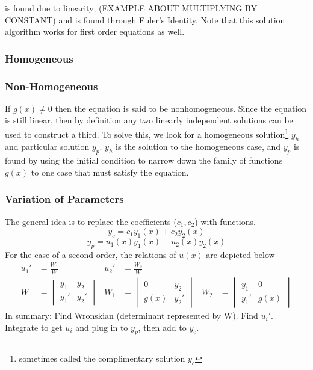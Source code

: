      is found due to linearity; (EXAMPLE ABOUT MULTIPLYING BY CONSTANT) and  is found through Euler's Identity. Note that this solution algorithm works for first order equations as well.  
    \\[0.25cm]
    
    \subsubsection{Homogeneous}
    \subsubsection{Non-Homogeneous}
        If $g(x)\neq0$ then the equation is said to be nonhomogeneous. Since the equation is still linear, then by definition any two linearly independent solutions can be used to construct a third. To solve this, we look for a homogeneous solution\footnote{sometimes called the complimentary solution $y_c$} $y_h$ and particular solution $y_p$. $y_h$ is the solution to the homogeneous case, and $y_p$ is found by using the initial condition to narrow down the family of functions $g(x)$ to one case that must satisfy the equation.

    \subsubsection{Variation of Parameters}
        The general idea is to replace the coefficients ($c_1,c_2$) with functions. 
        $$y_c=c_1y_1(x)+c_2y_2(x)$$
        $$y_p=u_1(x)y_1(x)+u_2(x)y_2(x)$$
        For the case of a second order, the relations of $u(x)$ are depicted below
        \begin{align*}
            u_1'&=\frac{W_1}{W} & u_2'&=\frac{W_2}{W}\\[0.7 cm]
            W&=
            \begin{vmatrix}
            y_1 & y_2 \\
            y_1'& y_2'
            \end{vmatrix}
            &
            W_1&=
            \begin{vmatrix}
            0 & y_2 \\
            g(x)& y_2'
            \end{vmatrix}
            &
            W_2&=
            \begin{vmatrix}
            y_1 & 0 \\
            y_1'& g(x)
            \end{vmatrix}
        \end{align*}
        In summary: Find Wronskian (determinant represented by W). Find $u_i'$. Integrate to get $u_i$ and plug in to $y_p$, then add to $y_c$.

